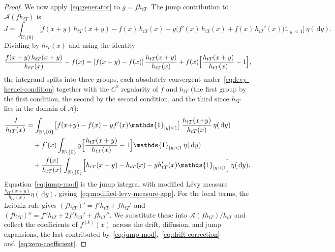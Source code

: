 \documentclass{article}
\newcommand{\levy}{{L\'evy }}
\def\1{\mathds{1}}
\def\R{\mathbb{R}}
\def\d{\,\mathrm{d}}
\theoremstyle{definition}
\begin{document}
\begin{proof}
We now apply~\eqref{eq:generator} to $g = fh_{tT}$. The jump contribution to $\mathcal{A}(fh_{tT})$ is
    \begin{equation*}
      J = \int_{\R\setminus\{0\}}\bigl[f(x{+}y)\,h_{tT}(x{+}y)
        - f(x)\,h_{tT}(x)
        - y\bigl(f'(x)\,h_{tT}(x) + f(x)\,h_{tT}'(x)\bigr)
        \1_{|y|<1}\bigr]\,\eta(\d y).
    \end{equation*}
Dividing by $h_{tT}(x)$ and using the identity
    \begin{equation*}
      \frac{f(x+y)\,h_{tT}(x+y)}{h_{tT}(x)} - f(x)
      = [f(x+y) - f(x)]\,\frac{h_{tT}(x+y)}{h_{tT}(x)}
        + f(x)\Bigl[\frac{h_{tT}(x+y)}{h_{tT}(x)} - 1\Bigr],
    \end{equation*}
    the integrand splits into three groups, each absolutely convergent under~\eqref{eq:levy-kernel-condition} together with the $C^{2}$ regularity of $f$ and $h_{tT}$ (the first group by the first condition, the second by the second condition, and the third since $h_{tT}$ lies in the domain of $\mathcal{A}$):
    \begin{align}
      \frac{J}{h_{tT}(x)}
      &= \int_{\R\setminus\{0\}}\bigl[f(x{+}y) - f(x) - yf'(x)\1_{|y|<1}\bigr]\,
         \frac{h_{tT}(x{+}y)}{h_{tT}(x)}\,\eta(\d y) \label{eq:jump-mod} \\
      &\quad + f'(x)\int_{\R\setminus\{0\}} y\Bigl[
         \frac{h_{tT}(x+y)}{h_{tT}(x)} - 1\Bigr]\1_{|y|<1}\,
         \eta(\d y) \label{eq:drift-correction} \\
      &\quad + \frac{f(x)}{h_{tT}(x)}\int_{\R\setminus\{0\}}\Bigl[
        h_{tT}(x+y) - h_{tT}(x)
         - yh_{tT}'(x)\1_{|y|<1}\Bigr]\,\eta(\d y).
         \label{eq:zero-coefficient}
    \end{align}
Equation~\eqref{eq:jump-mod} is the jump integral with modified \levy measure $\frac{h_{tT}(x+y)}{h_{tT}(x)}\eta(\d y)$, giving~\eqref{eq:modified-levy-measure-app}. For the local terms, the Leibniz rule gives $(fh_{tT})' = f'h_{tT} + fh_{tT}'$ and $(fh_{tT})'' = f''h_{tT} + 2f'h_{tT}' + fh_{tT}''$. We substitute these into $\mathcal{A}(fh_{tT})/h_{tT}$ and collect the coefficients of $f^{(k)}(x)$ across the drift, diffusion, and jump expansions, the last contributed by~\eqref{eq:jump-mod},~\eqref{eq:drift-correction} and~\eqref{eq:zero-coefficient}.


\end{proof}
\end{document}
